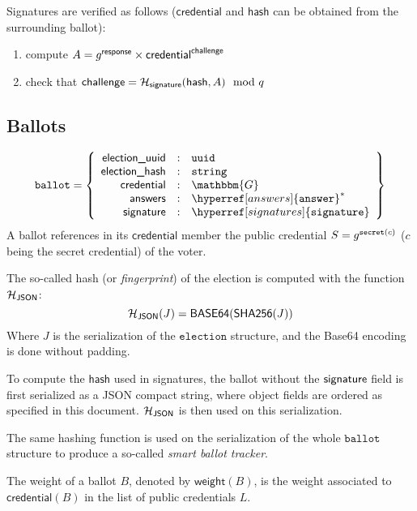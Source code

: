 \documentclass[a4paper]{article}
\newcommand{\G}{\mathbbm{G}}
\newcommand{\basesixfour}{\textsf{BASE64}}
\newcommand{\shatwo}{\textsf{SHA256}}
\newcommand{\jstring}{\texttt{string}}
\newcommand{\uuid}{\texttt{uuid}}
\newcommand{\election}{\texttt{election}}
\newcommand{\ballot}{\texttt{ballot}}
\begin{document}
Signatures are verified as follows ($\textsf{credential}$ and
$\textsf{hash}$ can be obtained from the surrounding ballot):
\begin{enumerate}
\item compute $A=g^{\textsf{response}}\times \textsf{credential}^{\textsf{challenge}}$
\item check that $\textsf{challenge}=\mathcal{H}_{\textsf{signature}}(\textsf{hash},A)\mod q$
\end{enumerate}

\subsection{Ballots}
\label{ballots}

\newcommand{\json}{\textsf{JSON}}

\begin{gather*}
  \ballot=\left\{
    \begin{array}{rcl}
      \textsf{election\_uuid}&:&\uuid\\
      \textsf{election\_hash}&:&\jstring\\
      \textsf{credential}&:&\G\\
      \answers&:&\hyperref[answers]{\answer}^\ast\\
      \siglabel&:&\hyperref[signatures]{\signature}
    \end{array}
  \right\}
\end{gather*}
A ballot references in its $\textsf{credential}$ member the public
credential $S=g^{\texttt{secret}(c)}$ ($c$ being the secret credential) of the
voter.

The so-called hash (or \emph{fingerprint}) of the election
is computed with the function $\Hash_\json$:
\[
\Hash_\json(J)=\basesixfour(\shatwo(J))
\]
Where $J$ is the serialization of the $\election$ structure, and the
Base64 encoding is done without padding.

To compute the $\textsf{hash}$ used in signatures, the ballot without
the $\textsf{signature}$ field is first serialized as a JSON compact string,
where object fields are ordered as specified in this
document. $\Hash_\json$ is then used on this serialization.

The same hashing function is used on the serialization of the whole
$\ballot$ structure to produce a so-called \emph{smart ballot
  tracker}.

The weight of a ballot $B$, denoted by $\textsf{weight}(B)$, is the
weight associated to $\textsf{credential}(B)$ in the list of public
credentials $L$.
\end{document}
